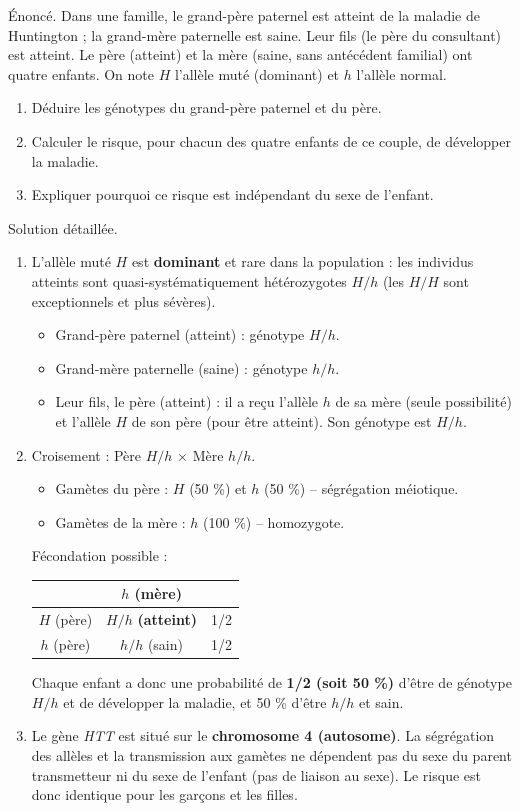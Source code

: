 \documentclass[11pt]{article}
\begin{document}
\begin{exoresolu}
Énoncé. Dans une famille, le grand-père paternel est atteint de la maladie de Huntington ; la grand-mère paternelle est saine. Leur fils (le père du consultant) est atteint. Le père (atteint) et la mère (saine, sans antécédent familial) ont quatre enfants. On note $H$ l'allèle muté (dominant) et $h$ l'allèle normal.
\begin{enumerate}
\item Déduire les génotypes du grand-père paternel et du père.
\item Calculer le risque, pour chacun des quatre enfants de ce couple, de développer la maladie.
\item Expliquer pourquoi ce risque est indépendant du sexe de l'enfant.
\end{enumerate}
\tcblower
Solution détaillée.
\begin{enumerate}
\item L'allèle muté $H$ est \textbf{dominant} et rare dans la population : les individus atteints sont quasi-systématiquement hétérozygotes $H/h$ (les $H/H$ sont exceptionnels et plus sévères).
  \begin{itemize}
  \item Grand-père paternel (atteint) : génotype \textbf{$H/h$}.
  \item Grand-mère paternelle (saine) : génotype \textbf{$h/h$}.
  \item Leur fils, le père (atteint) : il a reçu l'allèle $h$ de sa mère (seule possibilité) et l'allèle $H$ de son père (pour être atteint). Son génotype est \textbf{$H/h$}.
  \end{itemize}
\item Croisement : Père $H/h$ $\times$ Mère $h/h$.
  \begin{itemize}
  \item Gamètes du père : $H$ (50 \%) et $h$ (50 \%) -- ségrégation méiotique.
  \item Gamètes de la mère : $h$ (100 \%) -- homozygote.
  \end{itemize}
  Fécondation possible :
  \begin{center}
  \begin{tabular}{|c|c|c|}\hline
  & $h$ (mère) & \\ \hline
  $H$ (père) & $H/h$ \textbf{(atteint)} & 1/2 \\ \hline
  $h$ (père) & $h/h$ (sain) & 1/2 \\ \hline
  \end{tabular}
  \end{center}
  Chaque enfant a donc une probabilité de \textbf{1/2 (soit 50 \%)} d'être de génotype $H/h$ et de développer la maladie, et 50 \% d'être $h/h$ et sain.
\item Le gène \emph{HTT} est situé sur le \textbf{chromosome 4 (autosome)}. La ségrégation des allèles et la transmission aux gamètes ne dépendent pas du sexe du parent transmetteur ni du sexe de l'enfant (pas de liaison au sexe). Le risque est donc identique pour les garçons et les filles.
\end{enumerate}
\end{exoresolu}
\end{document}
